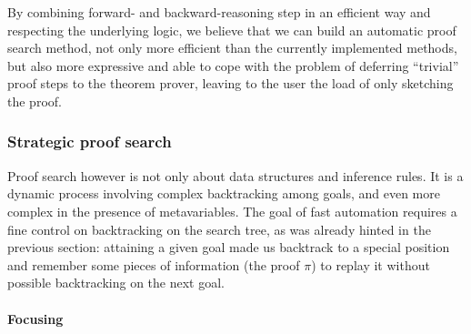 \documentclass[twoside,a4paper,12pt]{article}
\begin{document}
By combining forward- and backward-reasoning step in an efficient way
and respecting the underlying logic, we believe that we can build an
automatic proof search method, not only more efficient than the
currently implemented methods, but also more expressive and able to
cope with the problem of deferring ``trivial'' proof steps to the
theorem prover, leaving to the user the load of only sketching the
proof.

\subsubsection{Strategic proof search}
\label{sec:strat}

Proof search however is not only about data structures and inference
rules. It is a dynamic process involving complex backtracking among
goals, and even more complex in the presence of metavariables. The
goal of fast automation requires a fine control on backtracking on the
search tree, as was already hinted in the previous section: attaining
a given goal made us backtrack to a special position and remember some
pieces of information (the proof $\pi$) to replay it without possible
backtracking on the next goal.

\paragraph{Focusing}
\end{document}
